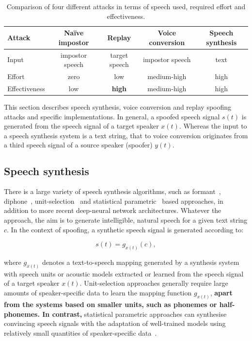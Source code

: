 \begin{table}
\renewcommand{\arraystretch}{1.3}
\begin{center}
    \begin{tabular}{ l | c c c c }
    \hline
     	 Attack & Na\"{i}ve impostor &  Replay & Voice conversion & Speech synthesis\\ 
    \hline
Input         & impostor speech  & target speech & impostor speech & text\\
Effort        & zero & low & medium-high & high\\
Effectiveness & low &  {\bfseries high} & medium-high & high\\
 \hline
\hline
    \end{tabular}
    \caption{Comparison of four different attacks in terms of speech used,  required effort and effectiveness.}
		\label{tab::attacks}
   \end{center}
\end{table}

This section describes speech synthesis, voice conversion and replay spoofing attacks and specific implementations.  In general, a spoofed speech signal $s(t)$ is generated from the speech signal of a target speaker $x(t)$.  Whereas the input to a speech synthesis system is a text string, that to voice conversion originates from a third speech signal of a source speaker (spoofer) $y(t)$.  



\subsection{Speech synthesis}
\label{ssec:spsyn}

There is a large variety of speech synthesis algorithms, such as formant~\cite{Klatt1980}, diphone~\cite{Moulines1990}, unit-selection~\cite{Hunt1996} and statistical parametric~\cite{Tokuda2000} based approaches, in addition to more recent deep-neural network architectures.  Whatever the approach, the aim is to generate intelligible, natural speech for a given text string $c$. In the context of spoofing, a synthetic speech signal is generated according to:

\begin{equation}
s(t) = g_{x(t)}(c),
\label{eq:tts}
\end{equation}

\noindent where $g_{x(t)}$ denotes a text-to-speech mapping generated by a synthesis system with speech units or acoustic models extracted or learned from the speech signal of a target speaker $x(t)$.  Unit-selection approaches generally require large amounts of speaker-specific data to learn the mapping function $g_{x(t)}$, {\bfseries apart from the systems based on smaller units, such as phonemes or half-phonemes. In contrast,} statistical parametric approaches can synthesise convincing speech signals with the adaptation of well-trained models using relatively small quantities of speaker-specific data~\cite{Zen2007a}.  

